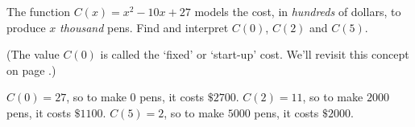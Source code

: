 {The function $C(x) = x^2-10x+27$  models the cost, in \textit{hundreds} of dollars, to produce $x$ \textit{thousand} pens.  Find and interpret $C(0)$, $C(2)$ and $C(5)$.

(The value $C(0)$ is called the `fixed' or `start-up' cost.  We'll revisit this concept on page \pageref{pricerevenuecostprofit}.) }
{$C(0) = 27$, so to make $0$ pens, it costs $\$ 2700$.  $C(2) = 11$, so to make $2000$ pens, it costs $\$1100$.  $C(5) = 2$, so to make $5000$ pens, it costs $\$2000$.}